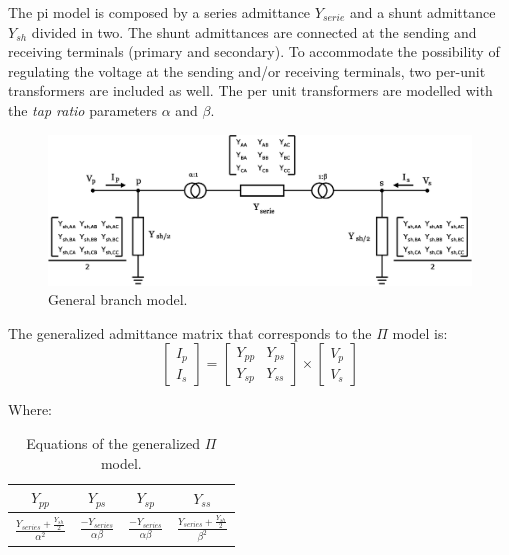 \documentclass[a4paper,twoside]{tufte-book}
\begin{document}
The pi model is composed by a series admittance  $Y_{serie}$ and a shunt admittance $Y_{sh}$ divided in two. The shunt admittances are connected at the sending and receiving terminals (primary and secondary). To accommodate the possibility of regulating the voltage at the sending and/or receiving terminals, two per-unit transformers are included as well. The per unit transformers are modelled with the \textit{tap ratio} parameters $\alpha$ and $\beta$.


\begin{center}
	\begin{figure}[h]
		\includegraphics[width=0.6\linewidth]{img/Branch.eps}
		\caption{General branch model.}
		\label{pi_model}
	\end{figure}
\end{center}

The generalized admittance matrix that corresponds to the $\Pi$ model is:
\begin{equation}
\left[\begin{array}{c}
I_p \\
I_s
\end{array}\right] = \left[\begin{array}{cc}
Y_{pp} & Y_{ps} \\
Y_{sp} & Y_{ss}
\end{array}\right] \times \left[\begin{array}{c}
V_p \\
V_s
\end{array}\right]
\label{pi_main_formula}
\end{equation}

Where:

\begin{table}[h!]
\begin{center}
\begin{tabular}{cccc}
\toprule

$Y_{pp}$ &  $Y_{ps}$ & $Y_{sp}$ & $Y_{ss}$\\

\midrule

$\frac{Y_{series} + \frac{Y_{sh}}{2}}{\alpha^2}$ &  $\frac{-Y_{series}}{\alpha\beta}$ & $\frac{-Y_{series}}{\alpha\beta}$ & $\frac{Y_{series} + \frac{Y_{sh}}{2}}{\beta^2}$\\

\bottomrule
\end{tabular}
\end{center}
  \caption{Equations of the generalized $\Pi$ model.}
  \label{pi_model_equations}
\end{table}
\end{document}
